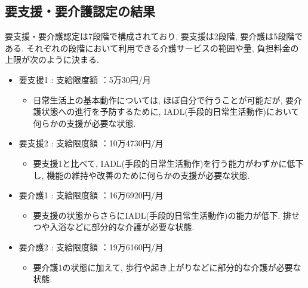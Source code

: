 \subsection{要支援・要介護認定の結果}
要支援・要介護認定は7段階で構成されており,  要支援は2段階, 要介護は5段階である.
それぞれの段階において利用できる介護サービスの範囲や量, 負担料金の上限が次のように決まる.

\begin{itemize} \setlength{\itemsep}{-0.5mm} \setlength{\parskip}{-0.5mm}
	\item 要支援1  :  支給限度額 ：5万30円/月
	      \begin{itemize} \setlength{\itemsep}{-0.5mm} \setlength{\parskip}{-0.5mm}
		      \item 日常生活上の基本動作については, ほぼ自分で行うことが可能だが, 要介護状態への進行を予防するために, IADL(手段的日常生活動作)において何らかの支援が必要な状態.
	      \end{itemize}

	\item 要支援2  :  支給限度額 ：10万4730円/月

	      \begin{itemize} \setlength{\itemsep}{-0.5mm} \setlength{\parskip}{-0.5mm}
		      \item 要支援1と比べて, IADL(手段的日常生活動作)を行う能力がわずかに低下し, 機能の維持や改善のために何らかの支援が必要な状態.

	      \end{itemize}

	\item 要介護1 : 支給限度額 ：16万6920円/月


	      \begin{itemize} \setlength{\itemsep}{-0.5mm} \setlength{\parskip}{-0.5mm}
		      \item 要支援の状態からさらにIADL(手段的日常生活動作)の能力が低下. 排せつや入浴などに部分的な介護が必要な状態.

	      \end{itemize}

	\item 要介護2 : 支給限度額 ：19万6160円/月


	      \begin{itemize} \setlength{\itemsep}{-0.5mm} \setlength{\parskip}{-0.5mm}
		      \item 要介護1の状態に加えて, 歩行や起き上がりなどに部分的な介護が必要な状態.


\end{itemize}
\end{itemize}
